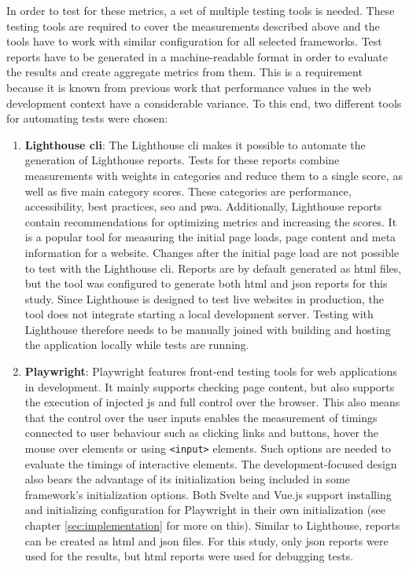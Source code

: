 \documentclass[a4paper, 12pt]{article}
\begin{document}
In order to test for these metrics, a set of multiple testing tools is needed.
These testing tools are required to cover the measurements described above and the tools have to work with similar configuration for all selected frameworks.
Test reports have to be generated in a machine-readable format in order to evaluate the results and create aggregate metrics from them.
This is a requirement because it is known from previous work that performance values in the web development context have a considerable variance.
To this end, two different tools for automating tests were chosen:

\begin{enumerate}
  \item \textbf{Lighthouse \acrshort{cli}}: The Lighthouse \acrshort{cli} makes it possible to automate the generation of Lighthouse reports.
  Tests for these reports combine measurements with weights in categories and reduce them to a single score, as well as five main category scores.
  These categories are performance, accessibility, best practices, \acrfull{seo} and \acrfull{pwa}.
  Additionally, Lighthouse reports contain recommendations for optimizing metrics and increasing the scores.
  It is a popular tool for measuring the initial page loads, page content and meta information for a website.
  Changes after the initial page load are not possible to test with the Lighthouse \acrshort{cli}.
  Reports are by default generated as \acrshort{html} files, but the tool was configured to generate both \acrshort{html} and \acrshort{json} reports for this study.
  Since Lighthouse is designed to test live websites in production, the tool does not integrate starting a local development server.
  Testing with Lighthouse therefore needs to be manually joined with building and hosting the application locally while tests are running.
  \item \textbf{Playwright}: Playwright features front-end testing tools for web applications in development.
  It mainly supports checking page content, but also supports the execution of injected \acrlong{js} and full control over the browser.
  This also means that the control over the user inputs enables the measurement of timings connected to user behaviour such as clicking links and buttons, hover the mouse over elements or using \verb|<input>| elements.
  Such options are needed to evaluate the timings of interactive elements.
  The development-focused design also bears the advantage of its initialization being included in some framework's initialization options.
  Both Svelte and Vue.js support installing and initializing configuration for Playwright in their own initialization (see chapter \ref{sec:implementation} for more on this).
  Similar to Lighthouse, reports can be created as \acrshort{html} and \acrshort{json} files.
  For this study, only \acrshort{json} reports were used for the results, but \acrshort{html} reports were used for debugging tests.
\end{enumerate}
\end{document}
